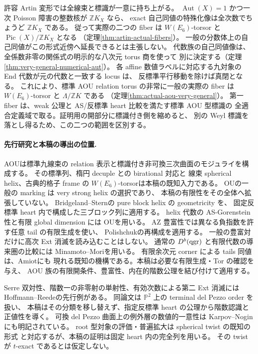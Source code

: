 \documentclass[11pt,a4paper]{ltjsarticle}
\theoremstyle{definition}\newtheorem{remark}[theorem]{注意}
\newcommand{\PP}{\mathbb P}\newcommand{\kk}{\mathbb C}
\newcommand{\Pic}{\operatorname{Pic}}\newcommand{\Aut}{\operatorname{Aut}}
\begin{document}
許容 Artin 変形では全線束と標識が一意に持ち上がる。
$\Aut(X)=1$ かつ一次 Poisson 障害の整数核が $\mathbb ZK_X$ なら、
exact 自己同値の特殊化像は全次数でちょうど $\mathbb ZK_X$ である。
従って実際の二つの fiber は $W(E_6)$-torsor と $\Pic(X)/\mathbb ZK_X$ となる
（定理\ref{thm:artin-actual-fibers}）。
一般の分数体上の自己同値がこの形式近傍へ延長できるとは主張しない。
代数族の自己同値像は、全係数非零の関係式の明示的な八次元 torus 商を使って
別に決定する（定理\ref{thm:very-general-numerical-aut}）。
各 affine 数値ラベルに対応する九対象の End 代数が元の代数と一致する locus は、
反標準平行移動を除けば真閉となる。
これにより、標準 AOU relation torus の非常に一般の実際の fiber は
$W(E_6)$-torsor と $\Lambda/\mathbb ZK$ である
（定理\ref{thm:actual-aou-very-general}）。
第一 fiber は、weak 公理と AS/反標準 heart 比較を満たす標準 AOU 型標識の
全適合定義域で取る。証明用の開部分に標識付き側を縮めると、
別の Weyl 標識を落とし得るため、この二つの範囲を区別する。

\paragraph{先行研究と本稿の導出の位置.}
AOU\cite{AOU}は標準九線束の relation 表示と標識付き非可換三次曲面のモジュライを構成する。
その標準列\cite[(4.1), (9.44)]{AOU}、楕円 decuple との birational 対応と
線束 spherical helix\cite[Theorem 1.1, Lemma 7.4]{AOU}、古典的格子 frame の
$W(E_6)$-torsor\cite[\S2.6]{DGK}は本稿の既知入力である。
OU\cite[Definition 1.1(3)]{OU2025}の一般の marking は very strong helix の選択であり、
本稿の有限性をその全体へ拡張していない。
Bridgeland--Stern\cite[Theorem 5.3(ii)]{BSHelices}の pure block helix の geometricity を、
固定反標準 heart 内で構成した三ブロック列に適用する。
helix 代数の AS-Gorenstein 性と有限 global dimension には
OU\cite[(18)--(25)および末尾の議論]{OUHelix}を用いる。
AZ 豊富性では異なる負指数を許す任意 tail の有限生成を使い、
Polishchuk\cite[Lemma 2.1(ii), Theorem 2.4]{PolishchukProj}の再構成を適用する。
一般の豊富対だけに高次 Ext 消滅を読み込むことはしない。
通常の $D^b(\operatorname{qgr})$ と有限代数の導来圏の比較には
Minamoto--Mori\cite[Corollary 4.13, Theorem 4.14]{MM}を用いる。
有限余次元 corner による tails 同値は、Amiot\cite[Corollary 3.3の証明]{AmiotCorners}にも
現れる既知の機構である。本稿は必要な有限生成・Tor の確認を与え、
AOU 族の有限開条件、豊富性、内在的階数公理を結び付けて適用する。

Serre 双対性、階数一の非零射の単射性、有効次数による第二 Ext 消滅には
Hoffmann--Reede\cite[Lemma 3.9]{HR}の先行例がある。
同論文は $\PP^2$ 上の terminal del Pezzo order を扱い、
本稿はその分類を移し替えず、指定反標準 heart の公理から階数認識と正値性を導く。
可換 del Pezzo 曲面上の例外層の数値的一意性は
Karpov--Nogin\cite[\S1.3, p.~433]{KN}にも明記されている。
root 型対象の評価・普遍拡大は spherical twist の既知の形式
\cite[Definitions 2.7, 2.9]{ST}と対応するが、本稿の証明は固定 heart 内の完全列を用いる。
その twist が $t$-exact であるとは仮定しない。
\end{document}
